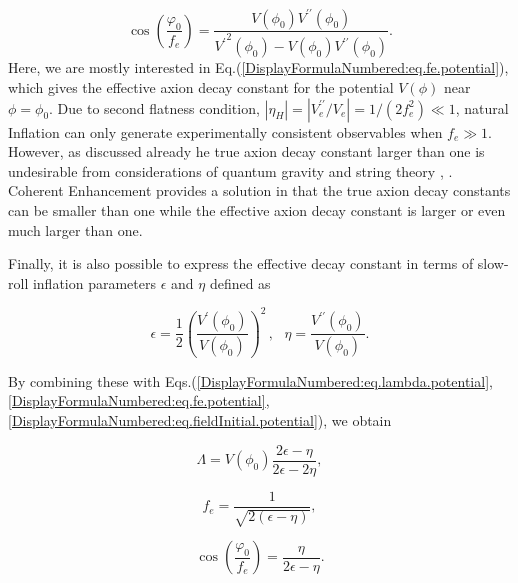 \documentclass[12pt]{article}
\begin{document}
\begin{equation}\label{DisplayFormulaNumbered:eq.fieldInitial.potential}
  \cos\left(\frac{\varphi_0}{f_e}\right)=\frac{V\left(\phi_0\right)V^{\prime\prime} \left(\phi_0\right)}{{V^\prime}^2\left(\phi_0\right)-V\left(\phi_0\right)V^{\prime\prime} \left(\phi_0\right)}.
\end{equation}
Here, we are mostly interested in Eq.(\ref{DisplayFormulaNumbered:eq.fe.potential}), which gives  the effective axion decay constant for the potential $V\left(\phi \right)$ near $\phi =\phi_0$.
Due to second flatness condition, $\left|\eta_H\right|=\left| V_e^{\prime\prime} /V_e \right|=1/\left(2f_e^2\right) \ll 1$, natural Inflation can only generate experimentally consistent observables when $f_e \gg 1$. However, as discussed already he true axion decay constant larger than one is undesirable from considerations of quantum gravity and string theory \cite{Kallosh:1995hi}, \cite{Banks:2003sx}. Coherent Enhancement provides a solution in that the true axion decay constants can be  smaller than one while the effective axion decay constant is larger or even much
larger than one.

Finally, it is also possible to express the effective decay constant in terms of slow-roll inflation parameters $\epsilon$ and $\eta$ defined as

\begin{equation}\label{DisplayFormulaNumbered:eq.epsilonV}
  \epsilon=\frac{1}{2}{\left(\frac{V^\prime \left(\phi_0\right)}{V\left(\phi_0\right)}\right)}^2\,,
  ~~~\eta=\frac{V^{\prime\prime} \left(\phi_0\right)}{V\left(\phi_0\right)}.
\end{equation}

By combining these with Eqs.(\ref{DisplayFormulaNumbered:eq.lambda.potential}, \ref{DisplayFormulaNumbered:eq.fe.potential}, \ref{DisplayFormulaNumbered:eq.fieldInitial.potential}), we obtain

\begin{equation}\label{DisplayFormulaNumbered:eq.lambda.slowRoll}
  \Lambda =V\left(\phi_0\right)\frac{2\epsilon-\eta}{2\epsilon-2\eta},
\end{equation}

\begin{equation}\label{DisplayFormulaNumbered:eq.fe.slowRoll}
  f_e=\frac{1}{\sqrt{2\left(\epsilon-\eta\right)}},
\end{equation}

\begin{equation}\label{DisplayFormulaNumbered:eq.fieldInitial.slowRoll}
  \cos\left(\frac{\varphi_0}{f_e}\right)=\frac{\eta}{2\epsilon-\eta}.
\end{equation}
\end{document}

